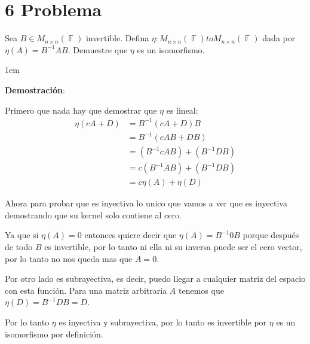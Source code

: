 \documentclass[12pt, fleqn]{article}                             %
\newenvironment{SmallIndentation}[1][0.75em]                    %
        {\begin{adjustwidth}{#1}{}\begin{footnotesize}}             %
        {\end{footnotesize}\end{adjustwidth}}                       %
\theoremstyle{break}                                            %
\DeclareMathOperator \GenericField {\mathbb{F}}                 %
\begin{document}
\clearpage
\section{6 Problema}

    Sea $B \in M_{n \times n}(\GenericField)$ invertible. 
    Defina $\eta : M_{n \times n}(\GenericField) to M_{n \times n}(\GenericField)$
    dada por $\eta(A) = B^{-1}AB$. Demuestre que $\eta$ es un isomorfismo.

    \begin{SmallIndentation}[1em]
        \textbf{Demostración}:
        
        Primero que nada hay que demostrar que $\eta$ es lineal:
        \begin{align*}
            \eta(cA + D)
                &= B^{-1}(cA + D)B                  \\
                &= B^{-1}(cAB + DB)                 \\
                &= (B^{-1}cAB) + (B^{-1}DB)         \\
                &= c(B^{-1}AB) + (B^{-1}DB)         \\
                &= c \eta(A) + \eta(D)              
        \end{align*}

        Ahora para probar que es inyectiva lo unico que vamos a ver
        que es inyectiva demostrando que su kernel solo contiene al cero.

        Ya que si $\eta(A) = 0$ entonces quiere decir que $\eta(A) = B^{-1}0B$
        porque después de todo $B$ es invertible, por lo tanto ni ella ni su inversa
        puede ser el cero vector, por lo tanto no nos queda mas que $A = 0$.

        Por otro lado es subrayectiva, es decir, puedo llegar a cualquier matriz
        del espacio con esta función. Para una matriz arbitraria $A$ tenemos que
        $\eta(D) = B^{-1}DB = D$.

        Por lo tanto $\eta$ es inyectiva y subrayectiva, por lo tanto es invertible
        por $\eta$ es un isomorfismo por definición.

    \end{SmallIndentation}




\clearpage
\end{document}

